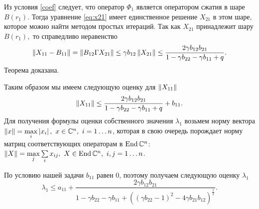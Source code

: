 Из условия \eqref{coef} следует, что оператор $\Phi_1$ является оператором сжатия в шаре $B(r_1).$ Тогда уравнение \eqref{eq:x21} имеет единственное решение $X_{21}$ в этом шаре, которое можно найти методом простых итераций. Так как $X_{21}$ принадлежит шару $B(r_1),$ то справедливо неравенство
\begin{align*}
\left\|X_{11} - B_{11}\right\| = \left\|B_{12}\Gamma X_{21}\right\| \leq \gamma b_{12} \left\|X_{21}\right\| \leq \frac{2\gamma b_{12}b_{21}}{1 - \gamma b_{22} - \gamma b_{11} + q}.
\end{align*}
Теорема доказана.

Таким образом мы имеем следующую оценку для $\left\|X_{11}\right\|$
$$
	\left\|X_{11}\right\| \leq \frac{2\gamma b_{12}b_{21}}{1 - \gamma b_{22} - \gamma b_{11} + q} + b_{11}.
$$
Для получения формулы оценки собственного значения $\lambda_1$ возьмем норму вектора $\left\|x\right\| = \max\limits_i\left|x_i\right|,\ x \in \mathbb{C}^n,\ i=1 \dots n$, которая в свою очередь порождает норму матриц соответствующих операторам в $\operatorname{End}\mathbb{C}^n$: $\left\|X\right\| = \max\limits_j\sum\limits_i x_{ij},\ X \in \operatorname{End}\mathbb{C}^n,\  i,j=1 \dots n$.

По условию нашей задачи $b_{11}$ равен 0, поэтому получаем следующую оценку $\lambda_1$
$$
	\lambda_1 \leq a_{11} + \frac{2\gamma b_{12}b_{21}}{1 - \gamma b_{22} - \gamma b_{11} + ((\gamma b_{22} - 1)^2 - 4\gamma b_{21}b_{12})^{\frac{1}{2}}}.
$$



